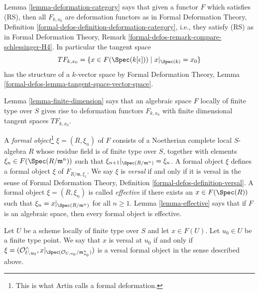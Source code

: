 \medskip\noindent
Lemma \ref{lemma-deformation-category} says that
given a functor $F$ which satisfies (RS), then all $F_{k, x_0}$
are deformation functors as in
Formal Deformation Theory, Definition
\ref{formal-defos-definition-deformation-category}, i.e., they satisfy
(RS) as in
Formal Deformation Theory, Remark
\ref{formal-defos-remark-compare-schlessinger-H4}.
In particular the tangent space
$$
TF_{k, x_0} = \{x \in F(\Spec(k[\epsilon])) \mid x|_{\Spec(k)} = x_0\}
$$
has the structure of a $k$-vector space by Formal Deformation Theory,
Lemma \ref{formal-defos-lemma-tangent-space-vector-space}.

\medskip\noindent
Lemma \ref{lemma-finite-dimension} says that an algebraic space $F$
locally of finite type over $S$ gives rise to deformation functors
$F_{k, x_0}$ with finite dimensional tangent spaces $TF_{k, x_0}$.

\medskip\noindent
A {\it formal object}\footnote{This is what Artin calls a formal deformation.}
$\xi = (R, \xi_n)$ of $F$ consists of a Noetherian
complete local $S$-algebra $R$ whose residue field is of finite type
over $S$, together with elements $\xi_n \in F(\Spec(R/\mathfrak m^n))$
such that $\xi_{n + 1}|_{\Spec(R/\mathfrak m^n)} = \xi_n$. A formal
object $\xi$ defines a formal object $\xi$ of $F_{R/\mathfrak m, \xi_1}$.
We say $\xi$ is {\it versal} if and only if it is versal in the sense of
Formal Deformation Theory, Definition \ref{formal-defos-definition-versal}.
A formal object $\xi = (R, \xi_n)$ is called {\it effective}
if there exists an $x \in F(\Spec(R))$ such that
$\xi_n = x|_{\Spec(R/\mathfrak m^n)}$ for all $n \geq 1$.
Lemma \ref{lemma-effective} says that if $F$ is an algebraic space,
then every formal object is effective.

\medskip\noindent
Let $U$ be a scheme locally of finite type over $S$ and let $x \in F(U)$.
Let $u_0 \in U$ be a finite type point. We say that $x$ is versal at $u_0$
if and only if
$\xi = (\mathcal{O}_{U, u_0}^\wedge,
x|_{\Spec(\mathcal{O}_{U, u_0}/\mathfrak m_{u_0}^n)})$
is a versal formal object in the sense described above.

